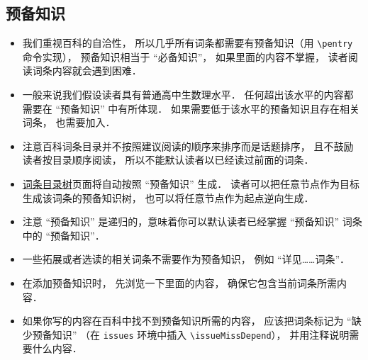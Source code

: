 
\subsection{预备知识}
\begin{itemize}
\item 我们重视百科的自洽性， 所以几乎所有词条都需要有预备知识（用 \verb|\pentry| 命令实现）， 预备知识相当于 “必备知识”， 如果里面的内容不掌握， 读者阅读词条内容就会遇到困难．
\item 一般来说我们假设读者具有普通高中生数理水平． 任何超出该水平的内容都需要在 “预备知识” 中有所体现． 如果需要低于该水平的预备知识且存在相关词条， 也需要加入．
\item 注意百科词条目录并不按照建议阅读的顺序来排序而是话题排序， 且不鼓励读者按目录顺序阅读， 所以不能默认读者以已经读过前面的词条．
\item \href{http://wuli.wiki/tree/}{词条目录树}页面将自动按照 “预备知识” 生成． 读者可以把任意节点作为目标生成该词条的预备知识树， 也可以将任意节点作为起点逆向生成．
\item 注意 “预备知识” 是递归的，意味着你可以默认读者已经掌握 “预备知识” 词条中的 “预备知识”．
\item 一些拓展或者选读的相关词条不需要作为预备知识， 例如 “详见……词条”．
\item 在添加预备知识时， 先浏览一下里面的内容， 确保它包含当前词条所需内容．
\item 如果你写的内容在百科中找不到预备知识所需的内容， 应该把词条标记为 “缺少预备知识” （在 \verb|issues| 环境中插入 \verb|\issueMissDepend|）， 并用注释说明需要什么内容．
\end{itemize}
